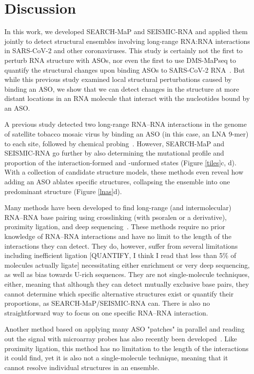 \documentclass[main.tex]{subfiles}
\begin{document}
\section{Discussion}
\label{discussion}

In this work, we developed SEARCH-MaP and SEISMIC-RNA and applied them jointly to detect structural ensembles involving long-range RNA:RNA interactions in SARS-CoV-2 and other coronaviruses. This study is certainly not the first to perturb RNA structure with ASOs, nor even the first to use DMS-MaPseq to quantify the structural changes upon binding ASOs to SARS-CoV-2 RNA~\cite{Zhu2022}. But while this previous study examined local structural perturbations caused by binding an ASO, we show that we can detect changes in the structure at more distant locations in an RNA molecule that interact with the nucleotides bound by an ASO.

A previous study detected two long-range RNA--RNA interactions in the genome of satellite tobacco mosaic virus by binding an ASO (in this case, an LNA 9-mer) to each site, followed by chemical probing~\cite{Archer2013}.
However, SEARCH-MaP and SEISMIC-RNA go further by also determining the mutational profile and proportion of the interaction-formed and -unformed states (Figure \ref{tiles}c, d).
With a collection of candidate structure models, these methods even reveal how adding an ASO ablates specific structures, collapsing the ensemble into one predominant structure (Figure \ref{lnas}d).

Many methods have been developed to find long-range (and intermolecular) RNA--RNA base pairing using crosslinking (with psoralen or a derivative), proximity ligation, and deep sequencing~\cite{Aw2016,Lu2016,Sharma2016,Ziv2018}. These methods require no prior knowledge of RNA--RNA interactions and have no limit to the length of the interactions they can detect. They do, however, suffer from several limitations including inefficient ligation [QUANTIFY, I think I read that less than 5\% of molecules actually ligate] necessitating either enrichment or very deep sequencing, as well as bias towards U-rich sequences. They are not single-molecule techniques, either, meaning that although they can detect mutually exclusive base pairs, they cannot determine which specific alternative structures exist or quantify their proportions, as SEARCH-MaP/SEISMIC-RNA can. There is also no straightforward way to focus on one specific RNA--RNA interaction.

Another method based on applying many ASO "patches" in parallel and reading out the signal with microarray probes has also recently been developed~\cite{Chiang2023}. Like proximity ligation, this method has no limitation to the length of the interactions it could find, yet it is also not a single-molecule technique, meaning that it cannot resolve individual structures in an ensemble.
\end{document}
